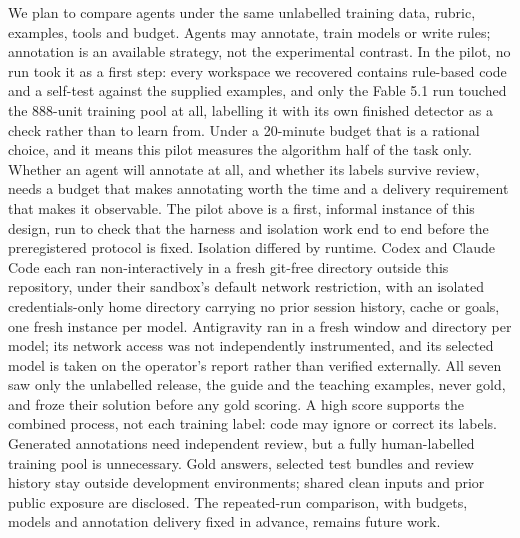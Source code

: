 \documentclass{article}
\begin{document}
We plan to compare agents under the same unlabelled training data, rubric, examples, tools and budget. Agents may annotate, train models or write rules; annotation is an available strategy, not the experimental contrast. In the pilot, no run took it as a first step: every workspace we recovered contains rule-based code and a self-test against the supplied examples, and only the Fable 5.1 run touched the 888-unit training pool at all, labelling it with its own finished detector as a check rather than to learn from. Under a 20-minute budget that is a rational choice, and it means this pilot measures the algorithm half of the task only. Whether an agent will annotate at all, and whether its labels survive review, needs a budget that makes annotating worth the time and a delivery requirement that makes it observable. The pilot above is a first, informal instance of this design, run to check that the harness and isolation work end to end before the preregistered protocol is fixed. Isolation differed by runtime. Codex and Claude Code each ran non-interactively in a fresh git-free directory outside this repository, under their sandbox's default network restriction, with an isolated credentials-only home directory carrying no prior session history, cache or goals, one fresh instance per model. Antigravity ran in a fresh window and directory per model; its network access was not independently instrumented, and its selected model is taken on the operator's report rather than verified externally. All seven saw only the unlabelled release, the guide and the teaching examples, never gold, and froze their solution before any gold scoring. A high score supports the combined process, not each training label: code may ignore or correct its labels. Generated annotations need independent review, but a fully human-labelled training pool is unnecessary. Gold answers, selected test bundles and review history stay outside development environments; shared clean inputs and prior public exposure are disclosed. The repeated-run comparison, with budgets, models and annotation delivery fixed in advance, remains future work.


\end{document}
